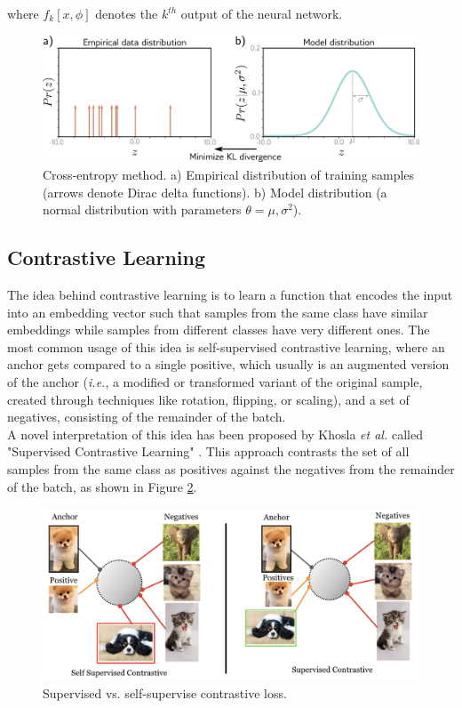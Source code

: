 \noindent where $f_{k}[x, \phi]$ denotes the $k^{th}$ output of the neural network.

\begin{figure}[H]
    \centering
    \includegraphics[width=0.9\linewidth]{Images/LossCrossEntropy.jpg}
    \caption{Cross-entropy method. a) Empirical distribution of training samples (arrows denote Dirac delta functions). b) Model distribution (a normal distribution with parameters $\theta = \mu, \sigma^{2}$).}
    \label{fig:LossCrossEntropy}
\end{figure}

\subsection{Contrastive Learning}
The idea behind contrastive learning is to learn a function that encodes the input into an embedding vector such that samples from the same class have similar embeddings while samples from different classes have very different ones. The most common usage of this idea is self-supervised contrastive learning, where an anchor gets compared to a single positive, which usually is an augmented version of the anchor (\textit{i.e.}, a modified or transformed variant of the original sample, created through techniques like rotation, flipping, or scaling), and a set of negatives, consisting of the remainder of the batch. \\
A novel interpretation of this idea has been proposed by Khosla \textit{et al.} called "Supervised Contrastive Learning" \cite{khosla2020supervised}. This approach contrasts the set of all samples from the same class as positives against the negatives from the remainder of the batch, as shown in Figure \ref{fig:SelfConVSSupCon}.

\begin{figure}[H]
    \centering
    \includegraphics[width=0.9\linewidth]{Images/SelfConVSSupCon.png}
    \caption{Supervised vs. self-supervise contrastive loss.}
    \label{fig:SelfConVSSupCon}
\end{figure}

